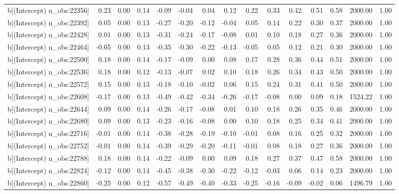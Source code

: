 \begin{table}[ht]
\begin{tabular}{rrrrrrrrrrrrrrr}
  b[(Intercept) n\_obs:22356] & 0.23 & 0.00 & 0.14 & -0.09 & -0.04 & 0.04 & 0.12 & 0.22 & 0.33 & 0.42 & 0.51 & 0.58 & 2000.00 & 1.00 \\ 
  b[(Intercept) n\_obs:22392] & 0.05 & 0.00 & 0.13 & -0.27 & -0.20 & -0.12 & -0.04 & 0.05 & 0.14 & 0.22 & 0.30 & 0.37 & 2000.00 & 1.00 \\ 
  b[(Intercept) n\_obs:22428] & 0.01 & 0.00 & 0.13 & -0.31 & -0.24 & -0.17 & -0.08 & 0.01 & 0.10 & 0.18 & 0.27 & 0.36 & 2000.00 & 1.00 \\ 
  b[(Intercept) n\_obs:22464] & -0.05 & 0.00 & 0.13 & -0.35 & -0.30 & -0.22 & -0.13 & -0.05 & 0.05 & 0.12 & 0.21 & 0.30 & 2000.00 & 1.00 \\ 
  b[(Intercept) n\_obs:22500] & 0.18 & 0.00 & 0.14 & -0.17 & -0.09 & 0.00 & 0.08 & 0.17 & 0.28 & 0.36 & 0.44 & 0.51 & 2000.00 & 1.00 \\ 
  b[(Intercept) n\_obs:22536] & 0.18 & 0.00 & 0.12 & -0.13 & -0.07 & 0.02 & 0.10 & 0.18 & 0.26 & 0.34 & 0.43 & 0.50 & 2000.00 & 1.00 \\ 
  b[(Intercept) n\_obs:22572] & 0.15 & 0.00 & 0.13 & -0.18 & -0.10 & -0.02 & 0.06 & 0.15 & 0.24 & 0.31 & 0.41 & 0.50 & 2000.00 & 1.00 \\ 
  b[(Intercept) n\_obs:22608] & -0.17 & 0.00 & 0.13 & -0.49 & -0.42 & -0.34 & -0.26 & -0.17 & -0.08 & 0.00 & 0.09 & 0.18 & 1524.22 & 1.00 \\ 
  b[(Intercept) n\_obs:22644] & 0.09 & 0.00 & 0.14 & -0.26 & -0.17 & -0.08 & 0.01 & 0.10 & 0.18 & 0.26 & 0.35 & 0.46 & 2000.00 & 1.00 \\ 
  b[(Intercept) n\_obs:22680] & 0.09 & 0.00 & 0.13 & -0.23 & -0.16 & -0.08 & 0.00 & 0.10 & 0.18 & 0.25 & 0.34 & 0.41 & 2000.00 & 1.00 \\ 
  b[(Intercept) n\_obs:22716] & -0.01 & 0.00 & 0.14 & -0.38 & -0.28 & -0.19 & -0.10 & -0.01 & 0.08 & 0.16 & 0.25 & 0.32 & 2000.00 & 1.00 \\ 
  b[(Intercept) n\_obs:22752] & -0.01 & 0.00 & 0.14 & -0.39 & -0.29 & -0.20 & -0.11 & -0.01 & 0.08 & 0.18 & 0.27 & 0.36 & 2000.00 & 1.00 \\ 
  b[(Intercept) n\_obs:22788] & 0.18 & 0.00 & 0.14 & -0.22 & -0.09 & 0.00 & 0.09 & 0.18 & 0.27 & 0.37 & 0.47 & 0.58 & 2000.00 & 1.00 \\ 
  b[(Intercept) n\_obs:22824] & -0.12 & 0.00 & 0.14 & -0.45 & -0.38 & -0.30 & -0.22 & -0.12 & -0.03 & 0.06 & 0.14 & 0.23 & 2000.00 & 1.00 \\ 
  b[(Intercept) n\_obs:22860] & -0.25 & 0.00 & 0.12 & -0.57 & -0.49 & -0.40 & -0.33 & -0.25 & -0.16 & -0.09 & -0.02 & 0.06 & 1496.79 & 1.00 \\ 

\end{tabular}
\end{table}
